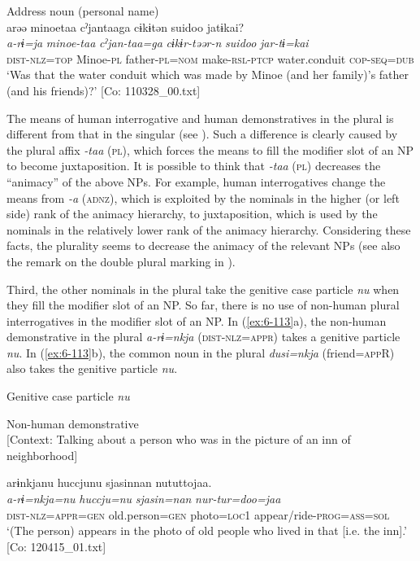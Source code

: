 \ex Address noun (personal name)\\
{\TM}
\glll  arəə  minoetaa  cˀjantaaga  cɨkɨtən  {\textbar}suidoo{\textbar}  jatɨkai?\\
\textit{a-rɨ=ja}  \textit{minoe-taa}  \textit{cˀjan-taa=ga}  \textit{cɨkɨr-təər-n}  \textit{suidoo}  \textit{jar-tɨ=kai}\\
\textsc{dist}-\textsc{nlz}=\textsc{top}  Minoe-\textsc{pl}  father-\textsc{pl}=\textsc{nom}  make-\textsc{rsl}-\textsc{ptcp} water.conduit  \textsc{cop}-\textsc{seq}=\textsc{dub}\\
\glt ‘Was that the water conduit which was made by Minoe (and her family)’s father (and his friends)?’ [Co: 110328\_00.txt]
\z

The means of human interrogative and human demonstratives in the plural is different from that in the singular (see ). Such a difference is clearly caused by the plural affix \textit{-taa} (\textsc{pl}), which forces the means to fill the modifier slot of an NP to become juxtaposition. It is possible to think that \textit{-taa} (\textsc{pl}) decreases the “animacy” of the above NPs. For example, human interrogatives change the means from \textit{-a} (\textsc{adnz}), which is exploited by the nominals in the higher (or left side) rank of the animacy hierarchy, to juxtaposition, which is used by the nominals in the relatively lower rank of the animacy hierarchy. Considering these facts, the plurality seems to decrease the animacy of the relevant NPs (see also the remark on the double plural marking in ).

  Third, the other nominals in the plural take the genitive case particle \textit{nu} when they fill the modifier slot of an NP. So far, there is no use of non-human plural interrogatives in the modifier slot of an NP. In (\ref{ex:6-113}a), the non-human demonstrative in the plural \textit{a-rɨ=nkja} (\textsc{dist}-\textsc{nlz}=\textsc{appr}) takes a genitive particle \textit{nu}. In (\ref{ex:6-113}b), the common noun in the plural \textit{dusi=nkja} (friend=\textsc{app}R) also takes the genitive particle \textit{nu}.

\ea\label{ex:6-113}
  Genitive case particle \textit{nu}

 \ea Non-human demonstrative\\{}
[Context: Talking about a person who was in the picture of an inn of neighborhood]

{\TM}
\glll arɨnkjanu  huccjunu  sjasinnan      nututtojaa.\\
      \textit{a-rɨ=nkja=nu}  \textit{huccju=nu}  \textit{sjasin=nan}    \textit{nur-tur=doo=jaa}\\
      \textsc{dist}-\textsc{nlz}=\textsc{appr}=\textsc{gen}  old.person=\textsc{gen}  photo=\textsc{loc1} appear/ride-\textsc{prog}=\textsc{ass}=\textsc{sol}\\
\glt ‘(The person) appears in the photo of old people who lived in that [i.e. the inn].’ [Co: 120415\_01.txt]
\z

